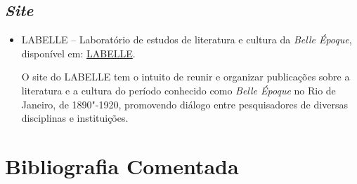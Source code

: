 \documentclass[12pt]{extarticle}
\begin{document}
\subsection{\emph{Site}}

\begin{itemize}
\item LABELLE -- Laboratório de estudos de literatura e cultura da \emph{Belle Époque}, 
disponível em: \href{http://labelleuerj.com.br/}{LABELLE}.

O site do LABELLE tem o intuito de reunir e organizar publicações sobre a literatura 
e a cultura do período conhecido como \emph{Belle Époque} no Rio de Janeiro, de 1890"-1920, 
promovendo diálogo entre pesquisadores de diversas disciplinas e instituições.
\end{itemize}

\section{Bibliografia Comentada}
\end{document}
